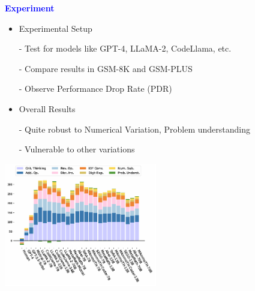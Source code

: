 \documentclass[professionalfont]{beamer}
\begin{document}
\begin{frame}
\begin{center}
    { \textbf{\textcolor{blue}{ {\fontsize{12}{14}\selectfont Experiment} }} }
\end{center}

{\fontsize{10}{14}\selectfont 
\begin{itemize}
    \item Experimental Setup
    
    - Test for models like GPT-4, LLaMA-2, CodeLlama, etc.
    
    - Compare results in GSM-8K and GSM-PLUS

    - Observe Performance Drop Rate (PDR)
\end{itemize}

\begin{itemize}
    \item Overall Results
    
    - Quite robust to Numerical Variation, Problem understanding
    
    - Vulnerable to other variations
\end{itemize}
}

\begin{center}
    \includegraphics[width=0.5\textwidth]{figure2.png}
\end{center}

\end{frame}
\end{document}
